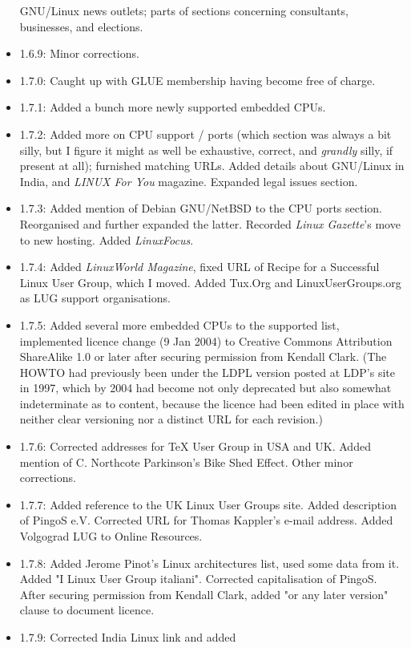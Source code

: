 \begin{itemize}
GNU/Linux news outlets; parts of sections concerning consultants, businesses,
and elections.
\item 1.6.9: Minor corrections.
\item 1.7.0: Caught up with GLUE membership having become free
of charge.
\item 1.7.1: Added a bunch more newly supported embedded CPUs.
\item 1.7.2: Added more on CPU support / ports (which section was always a bit silly, but I figure it might as well be exhaustive, correct, and {\itshape grandly\/} silly, if present at all); furnished matching URLs.  Added details about GNU/Linux in India, and {\itshape LINUX For You\/} magazine.  Expanded legal issues section.
\item 1.7.3: Added mention of Debian GNU/NetBSD to the CPU ports 
section.  Reorganised and further expanded the latter.  Recorded {\itshape Linux
Gazette\/}'s move to new hosting.  Added {\itshape LinuxFocus\/}.
\item 1.7.4: Added {\itshape LinuxWorld Magazine\/}, fixed URL of Recipe for
a Successful Linux User Group, which I moved.  Added Tux.Org and 
LinuxUserGroups.org as LUG support organisations.
\item 1.7.5: Added several more embedded CPUs to the supported list, implemented licence change (9 Jan 2004) to Creative Commons Attribution ShareAlike 1.0 or later after securing permission from Kendall Clark. (The HOWTO had previously been under the LDPL version posted at LDP's site in 1997, which by 2004 had become not only deprecated but also somewhat indeterminate as to content, because the licence had been edited in place with neither clear versioning nor a distinct URL for each revision.)
\item 1.7.6: Corrected addresses for TeX User Group in USA and
UK.  Added mention of C. Northcote Parkinson's Bike Shed Effect.  Other 
minor corrections.
\item 1.7.7: Added reference to the UK Linux User Groups site.
Added description of PingoS e.V.  Corrected URL for Thomas Kappler's 
e-mail address.  Added Volgograd LUG to Online Resources.
\item 1.7.8: Added Jerome Pinot's Linux architectures list,
used some data from it.  Added "I Linux User Group italiani".  
Corrected capitalisation of PingoS.  After securing permission from
Kendall Clark, added "or any later version" clause to document licence.
\item 1.7.9: Corrected India Linux link and added 

\end{itemize}
